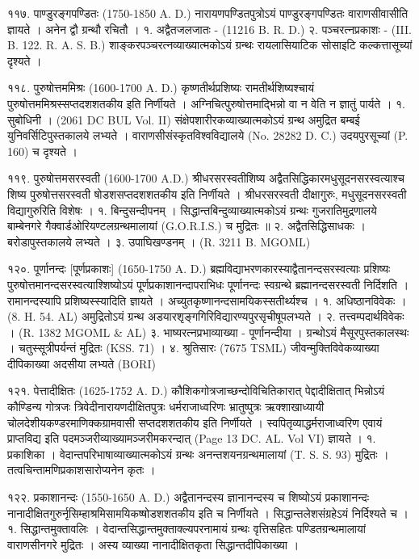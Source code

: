 ११७. पाण्डुरङ्गपण्डितः (1750-1850 A. D.)
नारायणपण्डितपुत्रोऽयं पाण्डुरङ्गपण्डितः वाराणसीवासीति ज्ञायते । अनेन द्वौ ग्रन्थौ रचितौ ।
१. अद्वैतजलजातः - (11216 B. R. D.)
२. पञ्चरत्नप्रकाशः - (III. B. 122. R. A. S. B.) शाङ्करपञ्चरत्नव्याख्यात्मकोऽयं ग्रन्थः रायलासियाटिक सोसाइटि कल्कत्तासूच्यां दृश्यते ।

११८. पुरुषोत्तममिश्रः (1600-1700 A. D.)
कृष्णतीर्थप्रशिष्यः रामतीर्थशिष्यश्चायं पुरुषोत्तममिश्रस्सप्तदशशतकीय इति निर्णीयते । अग्निचित्पुरुषोत्तमाद्भिन्नो वा न वेति न ज्ञातुं पार्यते ।
१. सुबोधिनी । (2061 DC BUL Vol. II) संक्षेपशारीरकव्याख्यात्मकोऽयं ग्रन्थ अमुद्रित बम्बई युनिवर्सिटिपुस्तकालये लभ्यते । वाराणसीसंस्कृतविश्वविद्यालये (No. 28282 D. C.) उदयपुरसूच्यां (P. 160) च दृश्यते ।

११९. पुरुषोत्तमसरस्वती (1600-1700 A.D.)
श्रीधरसरस्वतीशिष्य अद्वैतसिद्धिकारमधुसूदनसरस्वत्याश्च शिष्य पुरुषोत्तसरस्वती षोडशसप्तदशशतकीय इति निर्णीयते । श्रीधरसरस्वती दीक्षागुरुः, मधुसूदनसरस्वती विद्यागुरुरिति विशेषः ।
१. बिन्दुसन्दीपनम् । सिद्धान्तबिन्दुव्याख्यात्मकोऽयं ग्रन्थः गुजरातिमुद्रणालये बाम्बेनगरे गैक्वार्डओरियण्टलग्रन्थमालायां (G.O.R.I.S.) च मुद्रितः ॥
२. अद्वैतसिद्धिसाधकः । बरोडापुस्तकालये लभ्यते ।
३. उपाघिखण्डनम् । (R. 3211 B. MGOML)

१२०. पूर्णानन्दः [पूर्णप्रकाशः] (1650-1750 A. D.)
ब्रह्मविद्याभरणकारस्याद्वैतानन्दसरस्वत्याः प्रशिष्यः पुरुषोत्तमानन्दसरस्वत्याश्शिष्योऽयं पूर्णप्रकाशानन्दापराभिधः पूर्णानन्दः स्वग्रन्थे ब्रह्मानन्दसरस्वती निर्दिशति । रामानन्दस्यापि प्रशिष्यस्स्यादिति ज्ञायते । अच्युतकृष्णानन्दसामयिकस्सतीर्थ्यश्च ।
१. अधिष्ठानविवेकः । (8. H. 54. AL) अमुद्रितोऽयं ग्रन्थ अडयारशृङ्गगिरिविद्यारण्यपुरसृचीषूपलभ्यते ।
२. तत्त्वम्पदार्थविवेकः । (R. 1382 MGOML & AL)
३. भाष्यरत्नप्रभाव्याख्या - पूर्णानन्दीया । ग्रन्थोऽयं मैसूरपुस्तकालस्थः । चतुस्सूत्रीपर्यन्तं मुद्रितः (KSS. 71) ।
४. श्रुतिसारः (7675 TSML) जीवन्मुक्तिविवेकव्याख्या दीपिकाख्या अदसीया लभ्यते (BORI)

१२१. पेत्तादीक्षितः (1625-1752 A. D.)
कौशिकगोत्रजाच्छन्दोविचितिकारात् पेद्दादीक्षितात् भिन्नोऽयं कौण्डिन्य गोत्रजः त्रिवेदीनारायणदीक्षितपुत्रः धर्मराजाध्वरिणः भ्रातुष्पुत्रः ऋक्शाखाध्यायी चोलदेशीयकण्डरमाणिक्कग्रामवासी सप्तदशशतकीय इति निर्णीयते । स्वपितृव्याद्धर्मराजाध्वरिण एवायं प्राप्तविद्य इति पदमञ्जरीव्याख्यामञ्जरीमकरन्दात् (Page 13 DC. AL. Vol VI) ज्ञायते ।
१. प्रकाशिका । वेदान्तपरिभाषाव्याख्यात्मकोऽयं ग्रन्थः अनन्तशयनग्रन्थमालायां (T. S. S. 93) मुद्रितः । तत्वचिन्तामणिप्रकाशसारोप्यनेन कृतः ।

१२२. प्रकाशानन्दः (1550-1650 A. D.)
अद्वैतानन्दस्य ज्ञानानन्दस्य च शिष्योऽयं प्रकाशानन्दः नानादीक्षितगुरुर्नृसिम्हाश्रमिसामयिकष्षोडशशतकीय इति च निर्णीयते । सिद्धान्तलेशसंग्रहेऽयं निर्दिश्यते च ।
१. सिद्धान्तमुक्तावलिः । वेदान्तसिद्धान्तमुक्ताक्ल्यपरनामायं ग्रन्थः वृत्तिसहितः पण्डितग्रन्थमालायां वाराणसीनगरे मुद्रितः । अस्य व्याख्या नानादीक्षितकृता सिद्धान्तदीपिकाख्या ।

